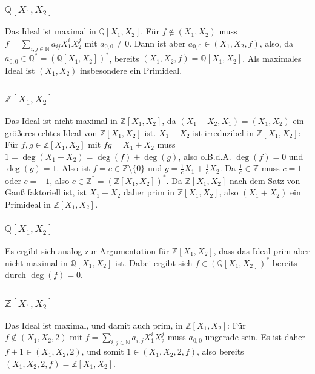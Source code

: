 \documentclass[a4paper,10pt]{article}
\theoremstyle{definition}
\newcommand{\N}{\mathbb{N}}
\newcommand{\Z}{\mathbb{Z}}
\newcommand{\Q}{\mathbb{Q}}
\begin{document}
\subsubsection{$\Q[X_1, X_2]$}
Das Ideal ist maximal in $\Q[X_1, X_2]$. Für $f \not\in (X_1, X_2)$ muss $f=\sum_{i,j \in \N} a_{ij} X^i_1 X^j_2$ mit $a_{0,0} \neq 0$. Dann ist aber $a_{0,0} \in (X_1, X_2, f)$, also, da $a_{0,0} \in \Q^* = (\Q[X_1, X_2])^*$, bereits $(X_1, X_2, f) = \Q[X_1, X_2]$. Als maximales Ideal ist $(X_1, X_2)$ insbesondere ein Primideal.


\subsection{}

\subsubsection{$\Z[X_1, X_2]$}
Das Ideal ist nicht maximal in $\Z[X_1, X_2]$, da $(X_1+X_2, X_1) = (X_1, X_2)$ ein größeres echtes Ideal von $\Z[X_1, X_2]$ ist. $X_1+X_2$ ist irreduzibel in $\Z[X_1, X_2]$: Für $f,g \in \Z[X_1, X_2]$ mit $fg = X_1 + X_2$ muss $1 = \deg(X_1 + X_2) = \deg(f) + \deg(g)$, also o.B.d.A. $\deg(f) = 0$ und $\deg(g) = 1$. Also ist $f = c \in \Z\setminus\{0\}$ und $g = \frac{1}{c}X_1 + \frac{1}{c}X_2$. Da $\frac{1}{c} \in \Z$ muss $c=1$ oder $c=-1$, also $c \in \Z^* = (\Z[X_1, X_2])^*$. Da $\Z[X_1, X_2]$ nach dem Satz von Gauß faktoriell ist, ist $X_1+X_2$ daher prim in $\Z[X_1, X_2]$, also $(X_1+X_2)$ ein Primideal in $\Z[X_1, X_2]$.

\subsubsection{$\Q[X_1, X_2]$}
Es ergibt sich analog zur Argumentation für $\Z[X_1, X_2]$, dass das Ideal prim aber nicht maximal in $\Q[X_1, X_2]$ ist. Dabei ergibt sich $f \in (\Q[X_1, X_2])^*$ bereits durch $\deg(f) = 0$.


\subsection{}

\subsubsection{$\Z[X_1, X_2]$}
Das Ideal ist maximal, und damit auch prim, in $\Z[X_1, X_2]$: Für $f \not\in (X_1, X_2, 2)$ mit $f = \sum_{i,j \in \N} a_{i,j} X^i_1 X^j_2$ muss $a_{0,0}$ ungerade sein. Es ist daher $f+1 \in (X_1, X_2, 2)$, und somit $1 \in (X_1, X_2, 2, f)$, also bereits $(X_1, X_2, 2, f) = \Z[X_1, X_2]$.
\end{document}
